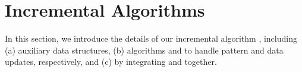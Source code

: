 \section{Incremental Algorithms}
\label{sec-IncAlg}

In this section, we introduce the details of our incremental algorithm \inc, including (a) auxiliary data structures,
(b) algorithms \incp and \incd to handle pattern and data updates, respectively, and (c) \inc by integrating \incp and \incd together.






